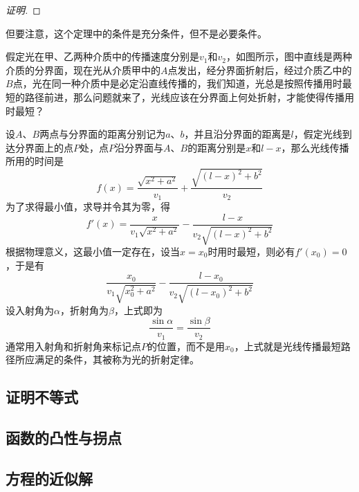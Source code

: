 \begin{proof}[证明]
  
\end{proof}

但要注意，这个定理中的条件是充分条件，但不是必要条件。

\begin{example}[光的折射定律]
  假定光在甲、乙两种介质中的传播速度分别是$v_1$和$v_2$，如图所示，图中直线是两种介质的分界面，现在光从介质甲中的$A$点发出，经分界面折射后，经过介质乙中的$B$点，光在同一种介质中是必定沿直线传播的，我们知道，光总是按照传播用时最短的路径前进，那么问题就来了，光线应该在分界面上何处折射，才能使得传播用时最短？

  设$A$、$B$两点与分界面的距离分别记为$a$、$b$，并且沿分界面的距离是$l$，假定光线到达分界面上的点$P$处，点$P$沿分界面与$A$、$B$的距离分别是$x$和$l-x$，那么光线传播所用的时间是
  \[ f(x) = \frac{\sqrt{x^2+a^2}}{v_1}+\frac{\sqrt{(l-x)^2+b^2}}{v_2} \]
  为了求得最小值，求导并令其为零，得
  \[ f'(x) = \frac{x}{v_1\sqrt{x^2+a^2}} - \frac{l-x}{v_2 \sqrt{(l-x)^2+b^2}} \]
  根据物理意义，这最小值一定存在，设当$x=x_0$时用时最短，则必有$f'(x_0)=0$，于是有
  \[ \frac{x_0}{v_1\sqrt{x_0^2+a^2}} - \frac{l-x_0}{v_2 \sqrt{(l-x_0)^2+b^2}}\]
  设入射角为$\alpha$，折射角为$\beta$，上式即为
  \[ \frac{\sin{\alpha}}{v_1} = \frac{\sin{\beta}}{v_2} \]
  通常用入射角和折射角来标记点$P$的位置，而不是用$x_0$，上式就是光线传播最短路径所应满足的条件，其被称为光的折射定律。
\end{example}

\subsection{证明不等式}
\label{sec:proof-inequality-use-derivative}

\subsection{函数的凸性与拐点}
\label{sec:convert-of-function}

\subsection{方程的近似解}
\label{sec:approx-solve-of-equation}






